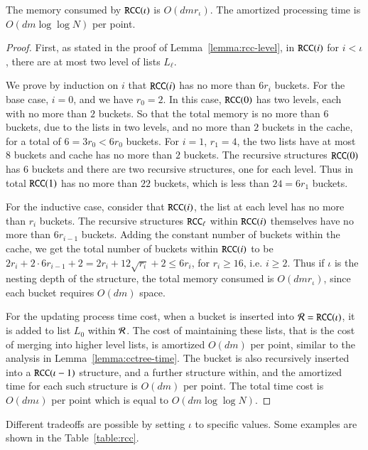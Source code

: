 \begin{lemma}
\label{lemma:rcc-performance}
The memory consumed by $\texttt{RCC}(\iota)$ is $O(dm r_{\iota})$. 
The amortized processing time is $O(dm \log \log N)$ per point.
\end{lemma}
\begin{proof}
First, as stated in the proof of Lemma~\ref{lemma:rcc-level}, 
in $\texttt{RCC}(i)$ for $i < \iota$, there are at most two level of lists $L_{\ell}$. 


We prove by induction on $i$ that $\texttt{RCC}(i)$ has no more than $6r_i$ buckets.  
For the base case, $i=0$, and we have $r_0=2$. 
In this case, $\texttt{RCC}(0)$ has two levels, each with no more than $2$ buckets. 
So that the total memory is no more than $6$ buckets, due to the lists in two levels, 
and no more than $2$ buckets in the cache, for a total of $6=3r_0 < 6r_0$ buckets. 
For $i=1$,  $r_1=4$, the two lists have at most $8$ buckets and cache has no more than $2$ buckets. 
The recursive structures $\texttt{RCC}(0)$ has $6$ buckets and there are two recursive structures, one for each level. 
Thus in total $\texttt{RCC}(1)$ has no more than $22$ buckets, which is less than $24 = 6r_1$ buckets. 

For the inductive case, consider that $\texttt{RCC}(i)$, the list at each level has no more than $r_i$ buckets. 
The recursive structures $\texttt{RCC}_{\ell}$ within $\texttt{RCC}(i)$ themselves have no more than $6r_{i-1}$ buckets. 
Adding the constant number of buckets within the cache, 
we get the total number of buckets within $\texttt{RCC}(i)$ to be 
$2r_i + 2 \cdot 6r_{i-1} + 2 = 2r_i + 12 \sqrt{r_i} + 2 \le 6 r_i$, 
for $r_i \ge 16$, i.e. $i \ge 2$. 
Thus if $\iota$ is the nesting depth of the structure, 
the total memory consumed is $O(dm r_{\iota})$, since each bucket requires $O(dm)$ space.

For the updating process time cost, when a bucket is inserted into $\mathcal{R} = \texttt{RCC}(\iota)$, 
it is added to list $L_0$ within $\mathcal{R}$. 
The cost of maintaining these lists, 
that is the cost of merging into higher level lists, 
is amortized $O(dm)$ per point, 
similar to the analysis in Lemma~\ref{lemma:cctree-time}. 
The bucket is also recursively inserted into a $\texttt{RCC}(\iota-1)$ structure, 
and a further structure within, 
and the amortized time for each such structure is $O(dm)$ per point. 
The total time cost is $O(dm\iota)$ per point which is equal to $O(dm \log \log N)$.
\end{proof}

Different tradeoffs are possible by setting $\iota$ to specific values. Some examples are shown in the Table~\ref{table:rcc}.
